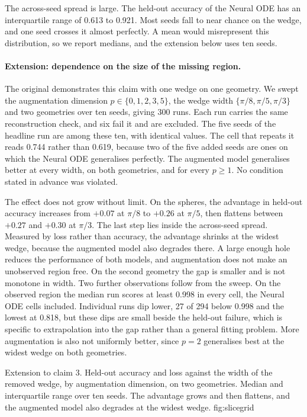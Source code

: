 The across-seed spread is large. The held-out accuracy of the Neural ODE has an interquartile
range of 0.613 to 0.921. Most seeds fall to near chance on the wedge, and one seed crosses it
almost perfectly. A mean would misrepresent this distribution, so we report medians, and the
extension below uses ten seeds.

\paragraph{Extension: dependence on the size of the missing region.}
The original demonstrates this claim with one wedge on one geometry. We swept the augmentation
dimension $p \in \{0,1,2,3,5\}$, the wedge width $\{\pi/8, \pi/5, \pi/3\}$ and two geometries
over ten seeds, giving 300 runs. Each run carries the same reconstruction check, and six fail
it and are excluded. The five seeds of the headline run are among these ten, with identical
values. The cell that repeats it reads 0.744 rather than 0.619, because two of the five added
seeds are ones on which the Neural ODE generalises perfectly. The augmented model generalises better at every width, on both
geometries, and for every $p \ge 1$. No condition stated in advance was violated.

The effect does not grow without limit. On the spheres, the advantage in held-out accuracy
increases from $+0.07$ at $\pi/8$ to $+0.26$ at $\pi/5$, then flattens between $+0.27$ and
$+0.30$ at $\pi/3$. The last step lies inside the across-seed spread. Measured by loss rather
than accuracy, the advantage shrinks at the widest wedge, because the augmented model also
degrades there. A large enough hole reduces the performance of both models, and augmentation
does not make an unobserved region free. On the second geometry the gap is smaller and is not
monotone in width. Two further observations follow from the sweep. On the observed region the
median run scores at least 0.998 in every cell, the Neural ODE cells included. Individual runs
dip lower, 27 of 294 below 0.998 and the lowest at 0.818, but these dips are small beside the
held-out failure, which is specific to extrapolation into the gap rather than a general fitting
problem. More augmentation is also
not uniformly better, since $p=2$ generalises best at the widest wedge on both geometries.

  {Extension to claim 3. Held-out accuracy and loss against the width of the removed wedge, by
   augmentation dimension, on two geometries. Median and interquartile range over ten seeds.
   The advantage grows and then flattens, and the augmented model also degrades at the widest
   wedge.}
  {fig:slicegrid}

